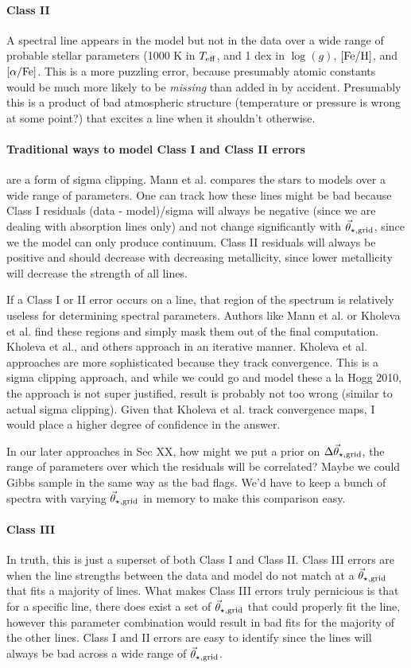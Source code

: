 \documentclass[preprint]{aastex} %
\newcommand{\vt}{\vec{\theta}}
\newcommand{\vg}{\vt_{\star, {\rm grid}}}
\newcommand{\Z}{[{\rm Fe}/{\rm H}]}
\newcommand{\A}{[\alpha/{\rm Fe}]}
\begin{document}
\paragraph{Class II} A spectral line appears in the model but not in the data over a wide range of probable stellar parameters (1000 K in $T_{\rm eff}$, and 1 dex in $\log(g)$, $\Z$, and $\A$. This is a more puzzling error, because presumably atomic constants would be much more likely to be \emph{missing} than added in by accident. Presumably this is a product of bad atmospheric structure (temperature or pressure is wrong at some point?) that excites a line when it shouldn't otherwise.

\paragraph{Traditional ways to model Class I and Class II errors} are a form of sigma clipping. Mann et al. compares the stars to models over a wide range of parameters. One can track how these lines might be bad because Class I residuals (data - model)/sigma will always be negative (since we are dealing with absorption lines only) and not change significantly with $\vg$, since we the model can only produce continuum. Class II residuals will always be positive and should decrease with decreasing metallicity, since lower metallicity will decrease the strength of all lines.

If a Class I or II error occurs on a line, that region of the spectrum is relatively useless for determining spectral parameters. Authors like Mann et al. or Kholeva et al. find these regions and simply mask them out of the final computation. Kholeva et al., and others approach in an iterative manner. Kholeva et al. approaches are more sophisticated because they track convergence. This is a sigma clipping approach, and while we could go and model these a la Hogg 2010, the approach is not super justified, result is probably not too wrong (similar to actual sigma clipping). Given that Kholeva et al. track convergence maps, I would place a higher degree of confidence in the answer.

In our later approaches in Sec XX, how might we put a prior on $\Delta \vg$, the range of parameters over which the residuals will be correlated? Maybe we could Gibbs sample in the same way as the bad flags. We'd have to keep a bunch of spectra with varying $\vg$ in memory to make this comparison easy.

\paragraph{Class III} In truth, this is just a superset of both Class I and Class II. Class III errors are when the line strengths between the data and model do not match at a $\vg$ that fits a majority of lines. What makes Class III errors truly pernicious is that for a specific line, there does exist a set of $\vg$ that could properly fit the line, however this parameter combination would result in bad fits for the majority of the other lines. Class I and II errors are easy to identify since the lines will always be bad across a wide range of $\vg$. 
\end{document}
